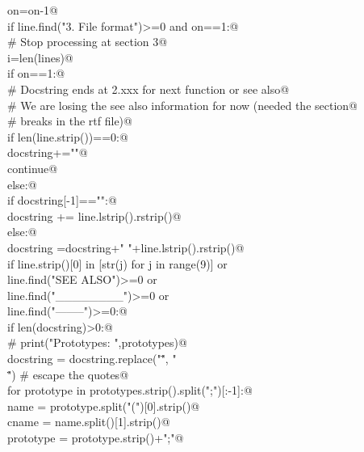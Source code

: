 \documentclass[10pt,a4paper,twoside,notitlepage]{article}
\begin{document}
\begin{flushleft}
\begin{minipage}{\linewidth}
\begin{list}{}{}
\mbox{}\verb@      on=on-1@\\
\mbox{}\verb@   if line.find("3. File format")>=0 and on==1:@\\
\mbox{}\verb@      # Stop processing at section 3@\\
\mbox{}\verb@      i=len(lines)@\\
\mbox{}\verb@   if on==1:@\\
\mbox{}\verb@      # Docstring ends at 2.xxx for next function or see also@\\
\mbox{}\verb@      # We are losing the see also information for now (needed the section@\\
\mbox{}\verb@      # breaks in the rtf file)@\\
\mbox{}\verb@      if len(line.strip())==0:@\\
\mbox{}\verb@         docstring+="\n"@\\
\mbox{}\verb@         continue@\\
\mbox{}\verb@      else:@\\
\mbox{}\verb@         if docstring[-1]=="\n":@\\
\mbox{}\verb@            docstring += line.lstrip().rstrip()@\\
\mbox{}\verb@         else:@\\
\mbox{}\verb@            docstring =docstring+" "+line.lstrip().rstrip()@\\
\mbox{}\verb@      if line.strip()[0] in [str(j) for j in range(9)] or \@\\
\mbox{}\verb@            line.find("SEE ALSO")>=0 or \@\\
\mbox{}\verb@            line.find("________")>=0 or \@\\
\mbox{}\verb@            line.find("--------")>=0:@\\
\mbox{}\verb@         if len(docstring)>0:@\\
\mbox{}\verb@            # print("Prototypes: ",prototypes)@\\
\mbox{}\verb@            docstring = docstring.replace("\"", " \\\"") # escape the quotes@\\
\mbox{}\verb@            for prototype in prototypes.strip().split(";")[:-1]:@\\
\mbox{}\verb@                name = prototype.split("(")[0].strip()@\\
\mbox{}\verb@                cname = name.split()[1].strip()@\\
\mbox{}\verb@                prototype = prototype.strip()+";"@\\

\end{list}
\end{minipage}
\end{flushleft}
\end{document}

